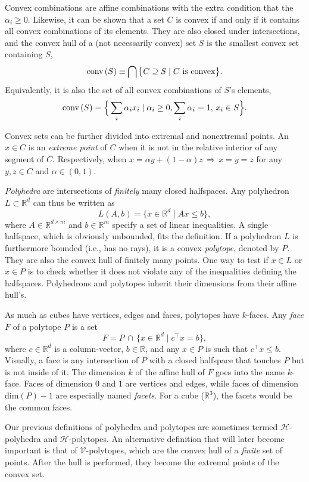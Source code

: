 		Convex combinations are affine combinations with the extra condition that the $\alpha_i \geq 0$. Likewise, it can be shown that a set $C$ is convex if and only if it contains all convex combinations of its elements. They are also closed under intersections, and the convex hull of a (not necessarily convex) set $S$ is the smallest convex set containing $S$,
		$$
			\text{conv} \left( S \right) \equiv \bigcap \big\{ C \supseteq S \mid C \text{ is convex} \big\} .
		$$
		Equivalently, it is also the set of all convex combinations of $S$'s elements,
		$$
			\text{conv} \left( S \right) = \Big\{ \sum_i \alpha_i x_i \mid \alpha_i \geq 0, \sum_i \alpha_i = 1, \, x_i \in S \Big\} .
		$$

		Convex sets can be further divided into extremal and nonextremal points. An $x \in C$ is an \emph{extreme point} of $C$ when it is not in the relative interior of any segment of $C$. Respectively, when $x = \alpha y + (1 - \alpha) z \,\Rightarrow\, x=y=z$ for any $y, z \in C$ and $\alpha \in (0, 1)$.

		\emph{Polyhedra} are intersections of \emph{finitely} many closed halfspaces. Any polyhedron $L \subset \mathbb{R}^d$ can thus be written as
		$$
			L(A, b) = \big\{ x \in \mathbb{R}^d \mid Ax \leq b \big\} ,
		$$
		where $A \in \mathbb{R}^{d \times m}$ and $b \in \mathbb{R}^m$ specify a set of linear inequalities. A single halfspace, which is obviously unbounded, fits the definition. If a polyhedron $L$ is furthermore bounded (i.e., has no rays), it is a convex \emph{polytope}, denoted by $P$. They are also the convex hull of finitely many points. One way to test if $x \in L$ or $x \in P$ is to check whether it does not violate any of the inequalities defining the halfspaces. Polyhedrons and polytopes inherit their dimensions from their affine hull's.

		As much as cubes have vertices, edges and faces, polytopes have $k$-faces. Any \emph{face} $F$ of a polytope $P$ is a set
		$$
			F = P \,\cap\, \{ x \in \mathbb{R}^d \mid c^\intercal x = b \} ,
		$$
		where $c \in \mathbb{R}^d$ is a column-vector, $b \in \mathbb{R}$, and any $x \in P$ is such that $c^\intercal x \leq b$. Visually, a face is any intersection of $P$ with a closed halfspace that touches $P$ but is not inside of it. The dimension $k$ of the affine hull of $F$ goes into the name $k$-face. Faces of dimension $0$ and $1$ are vertices and edges, while faces of dimension $\text{dim} (P) - 1$ are especially named \emph{facets}. For a cube ($\mathbb{R}^3$), the facets would be the common faces.

		Our previous definitions of polyhedra and polytopes are sometimes termed $\mathcal{H}$-polyhedra and $\mathcal{H}$-polytopes. An alternative definition that will later become important is that of $\mathcal{V}$-polytopes, which are the convex hull of a \emph{finite} set of points. After the hull is performed, they become the extremal points of the convex set.

